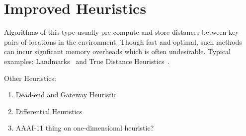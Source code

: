 \section{Improved Heuristics}
\label{cha::lit::heuristics}
Algorithms of this type usually pre-compute and store distances between key pairs of locations
in the environment. Though fast and optimal, such methods can incur signficant
memory overheads which is often undesirable. Typical examples: Landmarks~\cite{goldberg05} and
True Distance Heuristics~\cite{sturtevant09}.

Other Heuristics:
\begin{enumerate}
\item{Dead-end and Gateway Heuristic}
\item{Differential Heuristics}
\item{AAAI-11 thing on one-dimensional heuristic?}
\end{enumerate}

